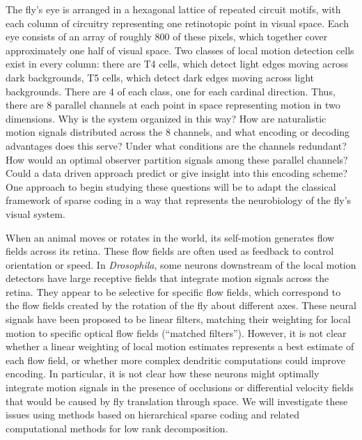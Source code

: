 The fly's eye is arranged in a hexagonal lattice of repeated circuit
motifs, with each column of circuitry representing one retinotopic
point in visual space. Each eye consists of an array of roughly 800 of
these pixels, which together cover approximately one half of visual
space. Two classes of local motion detection cells exist in every
column: there are T4 cells, which detect light edges moving across
dark backgrounds, T5 cells, which detect dark edges moving across
light backgrounds. There are 4 of each class, one for each cardinal
direction. Thus, there are 8 parallel channels at each point in space
representing motion in two dimensions. Why is the system organized in
this way? How are naturalistic motion signals distributed across the 8
channels, and what encoding or decoding advantages does this serve?
Under what conditions are the channels redundant? How would an optimal
observer partition signals among these parallel channels? Could a data
driven approach predict or give insight into this encoding scheme?
One approach to begin studying these questions will be to adapt
the classical framework of sparse coding \citep{Olshausen:Field:96}
in a way that represents the neurobiology of the fly's visual system.

When an animal moves or rotates in the world, its
self-motion generates flow fields across its retina. These flow fields
are often used as feedback to control orientation or speed.
In \textit{Drosophila}, some neurons downstream of the local motion
detectors have large receptive fields that integrate motion signals
across the retina. They appear to be selective for specific flow
fields, which correspond to the flow fields created by the rotation of
the fly about different axes. These neural signals have been proposed
to be linear filters, matching their weighting for local motion to
specific optical flow fields (``matched filters''). However, it is not
clear whether a linear weighting of local motion estimates represents
a best estimate of each flow field, or whether more complex dendritic
computations could improve encoding. In particular, it is not clear
how these neurons might optimally integrate motion signals in the
presence of occlusions or differential velocity fields that would be
caused by fly translation through space. We will investigate these
issues using methods based on hierarchical sparse coding 
\citep{Yu:2011} and related computational methods for
low rank decomposition.


